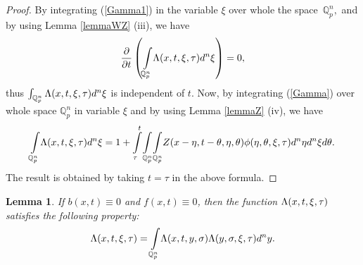 \documentclass{amsart}\usepackage{amsfonts}
\theoremstyle{plain}
\newtheorem{lemma}[theorem]{Lemma}
\numberwithin{equation}{section}
\begin{document}
\begin{proof}
By integrating (\ref{Gamma1}) in the variable $\xi$ over whole the
space\ $\mathbb{Q}_{p}^{n},$ and by using Lemma \ref{lemmaWZ} (iii), we have\[
\frac{\partial}{\partial t}\left(
{\displaystyle\int\limits_{\mathbb{Q}_{p}^{n}}}
{\LARGE \Lambda}(x,t,\xi,\tau)d^{n}\xi\right)  =0,
\]
thus $\int_{\mathbb{Q}_{p}^{n}}{\LARGE \Lambda}(x,t,\xi,\tau)d^{n}\xi$ is
independent of $t$. Now, by integrating (\ref{Gamma}) over whole space
$\mathbb{Q}_{p}^{n}$ in variable $\xi$ and by using Lemma \ref{lemmaZ} (iv),
we have\[{\displaystyle\int\limits_{\mathbb{Q}_{p}^{n}}}
{\LARGE \Lambda}(x,t,\xi,\tau)d^{n}\xi=1+{\displaystyle\int\limits_{\tau}^{t}}
\underset{\mathbb{Q}_{p}^{n}}{\int}\underset{\mathbb{Q}_{p}^{n}}{\int}Z(x-\eta,t-\theta,\eta,\theta)\phi(\eta,\theta,\xi,\tau)d^{n}\eta d^{n}\xi
d\theta.
\]
The result is obtained by taking $t=\tau$ in the above formula.
\end{proof}

\begin{lemma}
\label{lemma3_mp}If $b(x,t)\equiv0$ and $f(x,t)\equiv0$, then the function
${\LARGE \Lambda}(x,t,\xi,\tau)$ satisfies the following property:\begin{equation}
{\LARGE \Lambda}(x,t,\xi,\tau)={\displaystyle\int\limits_{\mathbb{Q}_{p}^{n}}}
{\LARGE \Lambda}(x,t,y,\sigma){\LARGE \Lambda}(y,\sigma,\xi,\tau)d^{n}y.
\label{IdentityL}\end{equation}

\end{lemma}
\end{document}
